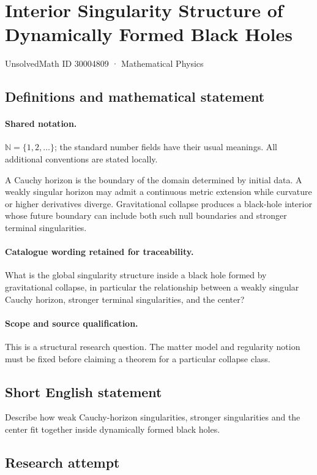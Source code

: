 \documentclass[11pt]{article}
\begin{document}
\setcounter{section}{30004808}
\section{Interior Singularity Structure of Dynamically Formed Black Holes}\label{30004809}
{\small UnsolvedMath ID 30004809 · Mathematical Physics}
\subsection{Definitions and mathematical statement}

\paragraph{Shared notation.}$\mathbb N=\{1,2,\ldots\}$; the standard number fields have their usual meanings. All additional conventions are stated locally.


A Cauchy horizon is the boundary of the domain determined by initial data. A weakly singular horizon may admit a continuous metric extension while curvature or higher derivatives diverge. Gravitational collapse produces a black-hole interior whose future boundary can include both such null boundaries and stronger terminal singularities.

\paragraph{Catalogue wording retained for traceability.}
What is the global singularity structure inside a black hole formed by gravitational collapse, in particular the relationship between a weakly singular Cauchy horizon, stronger terminal singularities, and the center?

\paragraph{Scope and source qualification.}This is a structural research question. The matter model and regularity notion must be fixed before claiming a theorem for a particular collapse class.
\subsection{Short English statement}
Describe how weak Cauchy-horizon singularities, stronger singularities and the center fit together inside dynamically formed black holes.
\subsection{Research attempt}
\end{document}
